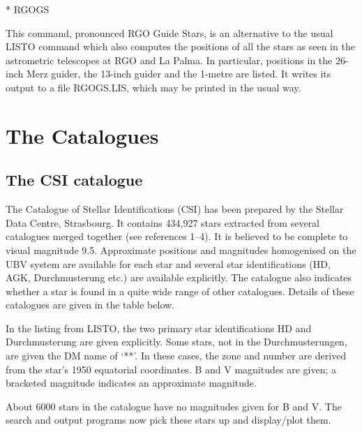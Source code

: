 \documentclass{article}
\begin{document}
* RGOGS

This command, pronounced RGO Guide Stars, is an alternative to the usual LISTO
command which also computes the positions of all the stars as seen in the
astrometric telescopes at RGO and La Palma.
In particular, positions in the 26-inch Merz guider, the 13-inch guider and the
1-metre are listed.
It writes its output to a file RGOGS.LIS, which may be printed in the usual way.
\section{The Catalogues}
\label{catalogues}
\subsection{The CSI catalogue}
The Catalogue of Stellar Identifications (CSI) has been prepared by the Stellar
Data Centre, Strasbourg.
It contains 434,927 stars extracted from several catalogues merged together (see
references 1--4).
It is believed to be complete to visual magnitude 9.5.
Approximate positions and magnitudes homogenised on the UBV system are available
for each star and several star identifications (HD, AGK, Durchmusterung etc.)
are available explicitly.
The catalogue also indicates whether a star is found in a quite wide range of
other catalogues.
Details of these catalogues are given in the table below.

In the listing from LISTO, the two primary star identifications HD and
Durchmusterung are given explicitly.
Some stars, not in the Durchmusterungen, are given the DM name of `**'.
In these cases, the zone and number are derived from the star's 1950 equatorial
coordinates.
B and V magnitudes are given; a bracketed magnitude indicates an approximate
magnitude.

About 6000 stars in the catalogue have no magnitudes given for B and V. The
search and output programs now pick these stars up and display/plot them.
\end{document}
